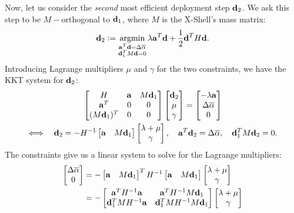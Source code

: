 \documentclass[10pt]{article}
\begin{document}
Now, let us consider the \emph{second} most efficient deployment step ${\bf d}_2$. We ask this step
to be $M-$orthogonal to ${\bf d}_1$, where $M$ is the X-Shell's mass matrix:
$$
{\bf d}_2 \vcentcolon= \operatorname*{argmin}_{\substack{{\bf a}^T {\bf d} = \Delta \overline{\alpha} \\ {\bf d}_1^T M {\bf d} = 0}}
        \lambda {\bf a}^T {\bf d} + \frac{1}{2} {\bf d}^T H {\bf d}.
$$
Introducing Lagrange multipliers $\mu$ and $\gamma$ for the two constraints, we have the KKT system for ${\bf d}_2$:
\begin{gather*}
\begin{bmatrix}
    H & {\bf a} & M {\bf d}_1 \\
    {\bf a}^T & 0 & 0 \\
    (M {\bf d}_1)^T & 0 & 0
\end{bmatrix}
\begin{bmatrix}
    {\bf d}_2 \\ \mu \\ \gamma
\end{bmatrix}
= 
\begin{bmatrix}
    -\lambda {\bf a} \\ \Delta \overline{\alpha} \\ 0
\end{bmatrix}
\\
\Longleftrightarrow \quad 
    {\bf d}_2 = -H^{-1} \begin{bmatrix} {\bf a} & M {\bf d}_1 \end{bmatrix}
                   \begin{bmatrix}\lambda + \mu \\ \gamma\end{bmatrix}, \quad
    {\bf a}^T {\bf d}_2 = \Delta \overline{\alpha}, \quad
    {\bf d}_1^T M {\bf d}_2 = 0.
\end{gather*}
The constraints give us a linear system to solve for the Lagrange multipliers:
\begin{align*}
\begin{bmatrix} \Delta \overline{\alpha} \\ 0 \end{bmatrix}
    &=
-\begin{bmatrix} {\bf a} & M {\bf d}_1 \end{bmatrix}^T 
H^{-1} \begin{bmatrix} {\bf a} & M {\bf d}_1 \end{bmatrix}
       \begin{bmatrix}\lambda + \mu \\ \gamma\end{bmatrix}
\\
    &=
    -\begin{bmatrix} {\bf a}^T H^{-1} {\bf a} & {\bf a}^T H^{-1} M {\bf d}_1 \\
                     {\bf d}_1^T M H^{-1} {\bf a} & {\bf d}_1^T M H^{-1} M {\bf d}_1
    \end{bmatrix}
       \begin{bmatrix}\lambda + \mu \\ \gamma\end{bmatrix}
\end{align*}
\end{document}
